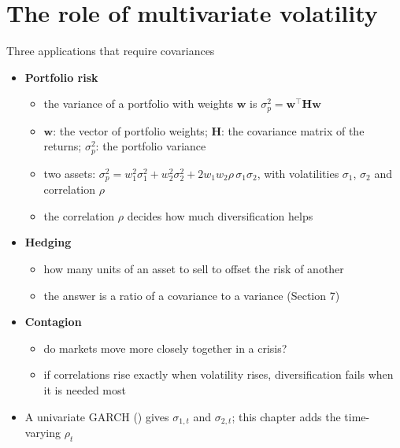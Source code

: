 \section{The role of multivariate volatility}

\begin{frame}{Three applications that require covariances}
\itemsize{\footnotesize}
\begin{itemize}
    \item \textbf{Portfolio risk}
    \begin{itemize}
        \item the variance of a portfolio with weights $\mathbf{w}$ is $\sigma_p^2 = \mathbf{w}^\top\mathbf{H}\mathbf{w}$ 
        \item $\mathbf{w}$: the vector of portfolio weights; $\mathbf{H}$: the covariance matrix of the returns; $\sigma_p^2$: the portfolio variance
        \item two assets: $\sigma_p^2 = w_1^2\sigma_1^2 + w_2^2\sigma_2^2 + 2w_1w_2\rho\,\sigma_1\sigma_2$, with volatilities $\sigma_1$, $\sigma_2$ and correlation $\rho$
        \item the correlation $\rho$ decides how much diversification helps
    \end{itemize}
    \item \textbf{Hedging}
    \begin{itemize}
        \item how many units of an asset to sell to offset the risk of another
        \item the answer is a ratio of a covariance to a variance (Section 7)
    \end{itemize}
    \item \textbf{Contagion}
    \begin{itemize}
        \item do markets move more closely together in a crisis?
        \item if correlations rise exactly when volatility rises, diversification fails when it is needed most 
    \end{itemize}
    \item A univariate GARCH () gives $\sigma_{1,t}$ and $\sigma_{2,t}$; this chapter adds the time-varying $\rho_t$
\end{itemize}
\end{frame}

